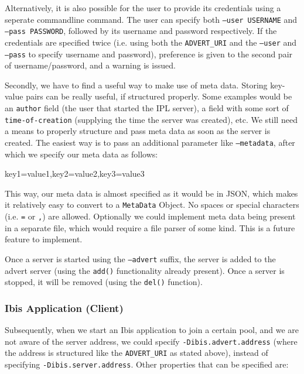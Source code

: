 Alternatively, it is also possible for the user to provide its credentials
using a seperate commandline command. The user can specify both \texttt{--user
USERNAME} and \texttt{--pass PASSWORD}, followed by its username and password
respectively. If the credentials are specified twice (i.e. using both the
\texttt{ADVERT\_URI} and the \texttt{--user} and \texttt{--pass} to specify
username and password), preference is given to the second pair of
username/password, and a warning is issued.

Secondly, we have to find a useful way to make use of meta data. Storing
key-value pairs can be really useful, if structured properly. Some examples
would be an \texttt{author} field (the user that started the IPL server), a
field with some sort of \texttt{time-of-creation} (supplying the time the
server was created), etc. We still need a means to properly structure
and pass meta data as soon as the server is created. The easiest way is to pass
an additional parameter like \texttt{--metadata}, after which we specify our
meta data as follows:

\begin{center}
\begin{code}
key1=value1,key2=value2,key3=value3
\end{code}
\end{center}

This way, our meta data is almost specified as it would be in JSON, which makes
it relatively easy to convert to a \texttt{MetaData} Object. No spaces or
special characters (i.e. \texttt{=} or \texttt{,}) are allowed. Optionally we
could implement meta data being present in a separate file, which would require a
file parser of some kind. This is a future feature to implement.

Once a server is started using the \texttt{--advert} suffix, the server is added
to the advert server (using the \texttt{add()} functionality already present).
Once a server is stopped, it will be removed (using the \texttt{del()}
function).

\subsubsection{Ibis Application (Client)}
Subsequently, when we start an Ibis application to join a certain pool, and we
are not aware of the server address, we could specify
\texttt{-Dibis.advert.address} (where the address is structured like the
\texttt{ADVERT\_URI} as stated above), instead of specifying
\texttt{-Dibis.server.address}. Other properties that can be specified are:

